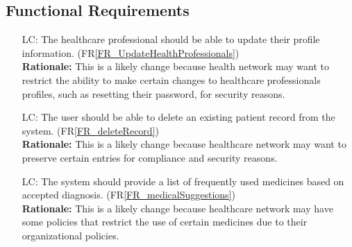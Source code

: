 \documentclass[12pt]{article}
\newcounter{lcnum} %
\begin{document}
\subsection{Functional Requirements}
\noindent \begin{itemize}
\item[LC\refstepcounter{lcnum}\thelcnum\label{LC_profileUpdate}:] The healthcare professional should be able to update their profile information. (FR\ref{FR_UpdateHealthProfessionals})\\
\textbf{Rationale:} This is a likely change because health network may want to restrict the ability to make certain changes to healthcare professionals profiles, such as resetting their password, for security reasons.

\item[LC\refstepcounter{lcnum}\thelcnum\label{LC_patientDelete}:] The user should be able to delete an existing patient record from the system. (FR\ref{FR_deleteRecord})\\
\textbf{Rationale:} This is a likely change because healthcare network may want to preserve certain entries for compliance and security reasons.

\item[LC\refstepcounter{lcnum}\thelcnum\label{LC_addHealthNetwork}:] The system should provide a list of frequently used medicines based on accepted diagnosis. (FR\ref{FR_medicalSuggestions})\\
\textbf{Rationale:} This is a likely change because healthcare network may have some policies that restrict the use of certain medicines due to their organizational policies.
\end{itemize}
\end{document}

